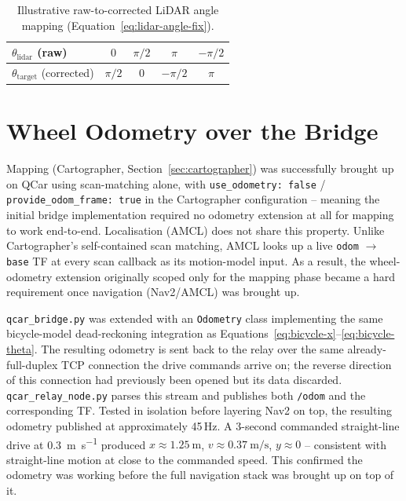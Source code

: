 \begin{table}[htbp]
  \centering
  \caption{Illustrative raw-to-corrected LiDAR angle mapping (Equation~\ref{eq:lidar-angle-fix}).}
  \label{tab:lidar-worked-example}
  \begin{tabular}{@{}lcccc@{}}
    \toprule
    $\theta_{\text{lidar}}$ (raw) & $0$ & $\pi/2$ & $\pi$ & $-\pi/2$ \\
    \midrule
    $\theta_{\text{target}}$ (corrected) & $\pi/2$ & $0$ & $-\pi/2$ & $\pi$ \\
    \bottomrule
  \end{tabular}
\end{table}

\section{Wheel Odometry over the Bridge}
\label{sec:onboard-bridge-odom}

Mapping (Cartographer, Section~\ref{sec:cartographer}) was
successfully brought up on QCar using scan-matching alone,
with \texttt{use\_odometry: false} / \texttt{provide\_odom\_frame:
true} in the Cartographer configuration -- meaning the initial bridge
implementation required no odometry extension at all for mapping to
work end-to-end. Localisation (AMCL) does not share this property. Unlike
Cartographer's self-contained scan matching, AMCL looks up a
live \texttt{odom} $\rightarrow$ \texttt{base} TF at every scan
callback as its motion-model input. As a result, the wheel-odometry
extension originally scoped only for the mapping phase became a hard
requirement once navigation (Nav2/AMCL) was brought up.

\texttt{qcar\_bridge.py} was extended with an \texttt{Odometry} class
implementing the same bicycle-model dead-reckoning integration as
Equations~\ref{eq:bicycle-x}--\ref{eq:bicycle-theta}. The resulting
odometry is sent back to the relay over the same already-full-duplex
TCP connection the drive commands arrive on; the reverse direction of
this connection had previously been opened but its data discarded.
\texttt{qcar\_relay\_node.py} parses this stream and publishes both
\texttt{/odom} and the corresponding TF. Tested in isolation before
layering Nav2 on top, the resulting odometry published at
approximately 45\,Hz. A 3-second commanded straight-line drive at
\SI{0.3}{\meter\per\second} produced $x \approx \SI{1.25}{\meter}$,
$v \approx \SI{0.37}{\meter\per\second}$, $y \approx 0$ -- consistent
with straight-line motion at close to the commanded speed. This
confirmed the odometry was working before the full navigation stack
was brought up on top of it.

